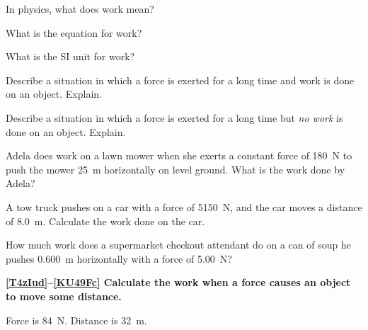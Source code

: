 \documentclass[main.tex]{subfiles}
\begin{document}

\begin{exercise} \label{S3zmkv}
    In physics, what does work mean?
\end{exercise}

\begin{exercise}
    What is the equation for work?
\end{exercise}

\begin{exercise}
    What is the SI unit for work?
\end{exercise}

\begin{exercise}
    Describe a situation in which a force is exerted for a long time and work is done on an object. Explain.
\end{exercise}

\begin{exercise} \label{g5xjKT}
    Describe a situation in which a force is exerted for a long time but \textit{no work} is done on an object. Explain.
\end{exercise}

\begin{exercise} \label{Xh4gxC}
    Adela does work on a lawn mower when she exerts a constant force of \SI{180}{N} to push the mower \SI{25}{m} horizontally on level ground. What is the work done by Adela?
\end{exercise}

\begin{exercise} \label{ZGiBxy}
A tow truck pushes on a car with a force of \SI{5150}{N}, and the car moves a distance of \SI{8.0}{m}. Calculate the work done on the car.
\end{exercise}

\begin{exercise} \label{MTcEJo}
    How much work does a supermarket checkout attendant do on a can of soup he pushes \SI{0.600}{m} horizontally with a force of \SI{5.00}{N}?
\end{exercise}

\cyanhrule

\vspace{1em}

\textbf{\ref{T4zIud}--\ref{KU49Fc} Calculate the work when a force causes an object to move some distance.}

\begin{exercise} \label{T4zIud}
    Force is \SI{84}{N}. Distance is \SI{32}{m}.
\end{exercise}
\end{document}

